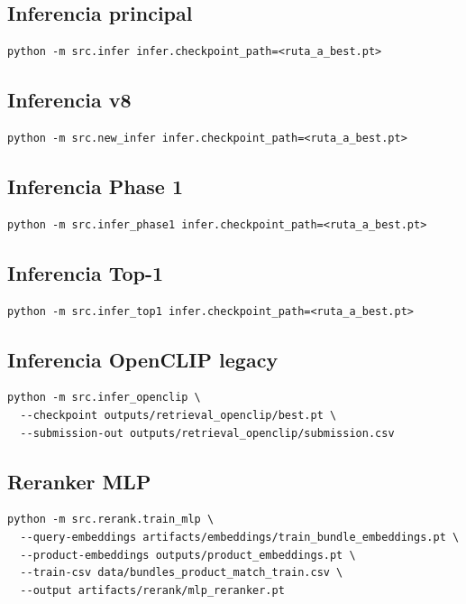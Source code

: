 \subsection{Inferencia principal}
\begin{verbatim}
python -m src.infer infer.checkpoint_path=<ruta_a_best.pt>
\end{verbatim}

\subsection{Inferencia v8}
\begin{verbatim}
python -m src.new_infer infer.checkpoint_path=<ruta_a_best.pt>
\end{verbatim}

\subsection{Inferencia Phase 1}
\begin{verbatim}
python -m src.infer_phase1 infer.checkpoint_path=<ruta_a_best.pt>
\end{verbatim}

\subsection{Inferencia Top-1}
\begin{verbatim}
python -m src.infer_top1 infer.checkpoint_path=<ruta_a_best.pt>
\end{verbatim}

\subsection{Inferencia OpenCLIP legacy}
\begin{verbatim}
python -m src.infer_openclip \
  --checkpoint outputs/retrieval_openclip/best.pt \
  --submission-out outputs/retrieval_openclip/submission.csv
\end{verbatim}

\subsection{Reranker MLP}
\begin{verbatim}
python -m src.rerank.train_mlp \
  --query-embeddings artifacts/embeddings/train_bundle_embeddings.pt \
  --product-embeddings outputs/product_embeddings.pt \
  --train-csv data/bundles_product_match_train.csv \
  --output artifacts/rerank/mlp_reranker.pt
\end{verbatim}

